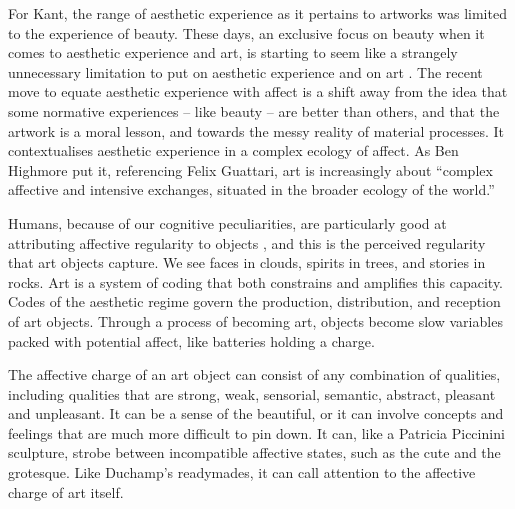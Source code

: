\documentclass[letterpaper]{article}
\begin{document}
    For Kant, the range of aesthetic experience as it pertains to artworks was limited to the experience of beauty. These days, an exclusive focus on beauty when it comes to aesthetic experience and art, is starting to seem like a strangely unnecessary limitation to put on aesthetic experience and on art \citep[pp.121–122]{HighmoreBttrAftrTst2010}. The recent move to equate aesthetic experience with affect is a shift away from the idea that some normative experiences – like beauty – are better than others, and that the artwork is a moral lesson, and towards the messy reality of material processes. It contextualises aesthetic experience in a complex ecology of affect. As Ben Highmore put it, referencing Felix Guattari, art is increasingly about “complex affective and intensive exchanges, situated in the broader ecology of the world.” \citep[p.155]{HighmoreBttrAftrTst2010}

    Humans, because of our cognitive peculiarities, are particularly good at attributing affective regularity to objects \citep{FristonThFrEnrgPrncpl2010} \citep{DeaconTheSymbolicSpecies1998}, and this is the perceived regularity that art objects capture. We see faces in clouds, spirits in trees, and stories in rocks. Art is a system of coding that both constrains and amplifies this capacity. Codes of the aesthetic regime govern the production, distribution, and reception of art objects. Through a process of becoming art, objects become slow variables packed with potential affect, like batteries holding a charge.

    The affective charge of an art object can consist of any combination of qualities, including qualities that are strong, weak, sensorial, semantic, abstract, pleasant and unpleasant. It can be a sense of the beautiful, or it can involve concepts and feelings that are much more difficult to pin down. It can, like a Patricia Piccinini sculpture, strobe between incompatible affective states, such as the cute and the grotesque. Like Duchamp's readymades, it can call attention to the affective charge of art itself.
\end{document}
